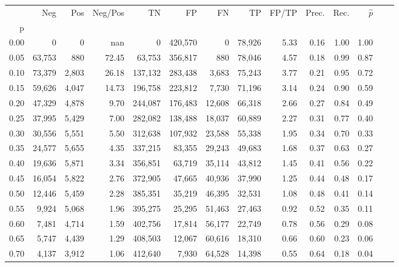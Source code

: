 \begin{tabular}{rrrrrrrrrrrrrr}
\toprule
{} &     Neg &    Pos & Neg/Pos &       TN &       FP &      FN &      TP & FP/TP & Prec. &  Rec. & $\hat{p}$ \\
p    &         &        &         &          &          &         &         &       &       &       &           \\
\midrule
0.00 &       0 &      0 &     nan &        0 &  420,570 &       0 &  78,926 &  5.33 &  0.16 &  1.00 &      1.00 \\
0.05 &  63,753 &    880 &   72.45 &   63,753 &  356,817 &     880 &  78,046 &  4.57 &  0.18 &  0.99 &      0.87 \\
0.10 &  73,379 &  2,803 &   26.18 &  137,132 &  283,438 &   3,683 &  75,243 &  3.77 &  0.21 &  0.95 &      0.72 \\
0.15 &  59,626 &  4,047 &   14.73 &  196,758 &  223,812 &   7,730 &  71,196 &  3.14 &  0.24 &  0.90 &      0.59 \\
0.20 &  47,329 &  4,878 &    9.70 &  244,087 &  176,483 &  12,608 &  66,318 &  2.66 &  0.27 &  0.84 &      0.49 \\
0.25 &  37,995 &  5,429 &    7.00 &  282,082 &  138,488 &  18,037 &  60,889 &  2.27 &  0.31 &  0.77 &      0.40 \\
0.30 &  30,556 &  5,551 &    5.50 &  312,638 &  107,932 &  23,588 &  55,338 &  1.95 &  0.34 &  0.70 &      0.33 \\
0.35 &  24,577 &  5,655 &    4.35 &  337,215 &   83,355 &  29,243 &  49,683 &  1.68 &  0.37 &  0.63 &      0.27 \\
0.40 &  19,636 &  5,871 &    3.34 &  356,851 &   63,719 &  35,114 &  43,812 &  1.45 &  0.41 &  0.56 &      0.22 \\
0.45 &  16,054 &  5,822 &    2.76 &  372,905 &   47,665 &  40,936 &  37,990 &  1.25 &  0.44 &  0.48 &      0.17 \\
0.50 &  12,446 &  5,459 &    2.28 &  385,351 &   35,219 &  46,395 &  32,531 &  1.08 &  0.48 &  0.41 &      0.14 \\
0.55 &   9,924 &  5,068 &    1.96 &  395,275 &   25,295 &  51,463 &  27,463 &  0.92 &  0.52 &  0.35 &      0.11 \\
0.60 &   7,481 &  4,714 &    1.59 &  402,756 &   17,814 &  56,177 &  22,749 &  0.78 &  0.56 &  0.29 &      0.08 \\
0.65 &   5,747 &  4,439 &    1.29 &  408,503 &   12,067 &  60,616 &  18,310 &  0.66 &  0.60 &  0.23 &      0.06 \\
0.70 &   4,137 &  3,912 &    1.06 &  412,640 &    7,930 &  64,528 &  14,398 &  0.55 &  0.64 &  0.18 &      0.04 \\

\end{tabular}
